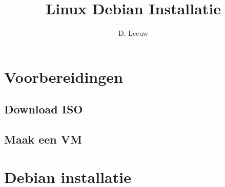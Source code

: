 \documentclass[a4paper,12pt,twoside,openright,titlepage]{article}
\author{D. Leeuw}
\title{Linux Debian Installatie}
\date{\today\\
0.5.0\\
\vfill
\raggedright
\copyright\ 2020-2025 Dennis Leeuw\\
}
\begin{document}

\maketitle


%
%


\section{Voorbereidingen}
\subsection{Download ISO}

\subsection{Maak een VM}


\section{Debian installatie}


\printindex
\end{document}
